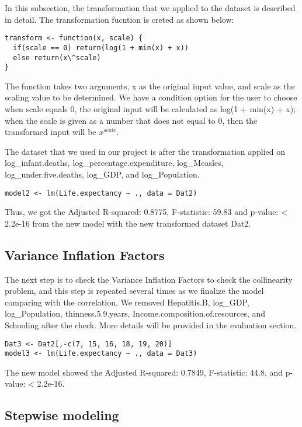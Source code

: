 In this subsection, the transformation that we applied to the dataset is described in detail. The transformation fucntion is creted as shown below:

\begin{verbatim}
transform <- function(x, scale) {
  if(scale == 0) return(log(1 + min(x) + x))
  else return(x\^scale)
}
\end{verbatim}

The function takes two arguments, x as the original input value, and scale as the scaling value to be determined. We have a condition option for the user to choose when scale equals 0, the original input will be calculated as log(1 + min(x) + x); when the scale is given as a number that does not equal to 0, then the transformed input will be $x^{scale}$.

The dataset that we used in our project is after the transformation applied on log\_infant.deaths, log\_percentage.expenditure, log\_Measles, log\_under.five.deaths, log\_GDP, and log\_Population.

\begin{verbatim}
model2 <- lm(Life.expectancy ~ ., data = Dat2)
\end{verbatim}

Thus, we got the Adjusted R-squared: 0.8775, F-statistic: 59.83 and p-value: < 2.2e-16 from the new model with the new transformed dataset Dat2.

\subsection{Variance Inflation Factors}

The next step is to check the Variance Inflation Factors to check the collinearity problem, and this step is repeated several times as we finalize the model comparing with the correlation. We removed Hepatitis.B, log\_GDP, log\_Population, thinness.5.9.years, Income.composition.of.resources, and Schooling after the check. More details will be provided in the evaluation section.


\begin{verbatim}
Dat3 <- Dat2[,-c(7, 15, 16, 18, 19, 20)]
model3 <- lm(Life.expectancy ~ ., data = Dat3)
\end{verbatim}
The new model showed the Adjusted R-squared: 0.7849, F-statistic:  44.8, and p-value: < 2.2e-16.


\subsection{Stepwise modeling}

